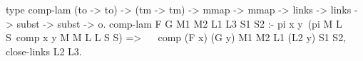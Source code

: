 \begin{elpicode}
  type comp-lam (to -> to) -> (tm -> tm) -> 
    mmap -> mmap -> links -> links -> subst -> subst -> o.
  comp-lam F G M1 M2 L1 L3 S1 S2 :-
    pi x y\ (pi M L S\ comp x y M M L L S S) =>         ~~
      comp (F x) (G y) M1 M2 L1 (L2 y) S1 S2,
    close-links L2 L3.
\end{elpicode}
